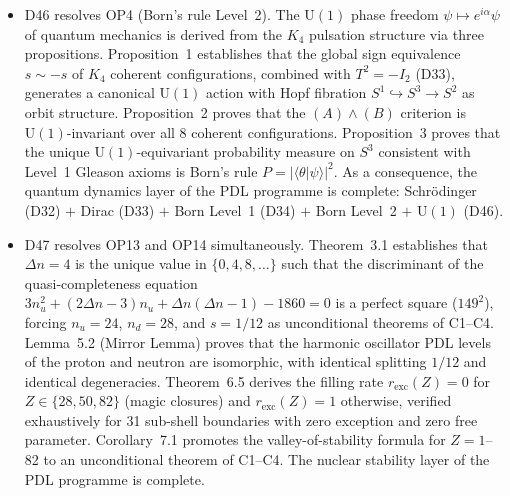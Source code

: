 \documentclass[11pt,a4paper]{article}
\theoremstyle{plain}
\theoremstyle{definition}
\theoremstyle{remark}
\begin{document}
\begin{itemize}
\item D46 resolves OP4 (Born's rule Level~2). The $\mathrm{U}(1)$ phase freedom $\psi \mapsto e^{i\alpha}\psi$ of quantum mechanics is derived from the $K_4$ pulsation structure via three propositions. Proposition~1 establishes that the global sign equivalence $s \sim -s$ of $K_4$ coherent configurations, combined with $T^2 = -I_2$ (D33), generates a canonical $\mathrm{U}(1)$ action with Hopf fibration $S^1 \hookrightarrow S^3 \to S^2$ as orbit structure. Proposition~2 proves that the $(A)\wedge(B)$ criterion is $\mathrm{U}(1)$-invariant over all 8 coherent configurations. Proposition~3 proves that the unique $\mathrm{U}(1)$-equivariant probability measure on $S^3$ consistent with Level~1 Gleason axioms is Born's rule $P = |\langle\theta|\psi\rangle|^2$. As a consequence, the quantum dynamics layer of the PDL programme is complete: Schr\"odinger (D32) $+$ Dirac (D33) $+$ Born Level~1 (D34) $+$ Born Level~2 $+$ $\mathrm{U}(1)$ (D46).

\item D47 resolves OP13 and OP14 simultaneously. Theorem~3.1 establishes that $\Delta n = 4$ is the unique value in $\{0, 4, 8, \ldots\}$ such that the discriminant of the quasi-completeness equation $3n_u^2 + (2\Delta n - 3)n_u + \Delta n(\Delta n - 1) - 1860 = 0$ is a perfect square ($149^2$), forcing $n_u = 24$, $n_d = 28$, and $s = 1/12$ as unconditional theorems of C1--C4. Lemma~5.2 (Mirror Lemma) proves that the harmonic oscillator PDL levels of the proton and neutron are isomorphic, with identical splitting $1/12$ and identical degeneracies. Theorem~6.5 derives the filling rate $r_{\mathrm{exc}}(Z) = 0$ for $Z \in \{28, 50, 82\}$ (magic closures) and $r_{\mathrm{exc}}(Z) = 1$ otherwise, verified exhaustively for 31 sub-shell boundaries with zero exception and zero free parameter. Corollary~7.1 promotes the valley-of-stability formula for $Z = 1$--82 to an unconditional theorem of C1--C4. The nuclear stability layer of the PDL programme is complete.


\end{itemize}
\end{document}
